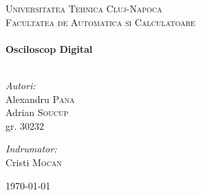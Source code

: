 \begin{titlepage}
\begin{center}

\textsc{\LARGE Universitatea Tehnica Cluj-Napoca}\\[1.5cm]

\textsc{\Large Facultatea de Automatica si Calculatoare}\\[0.5cm]

\HRule \\[0.4cm]
{ \huge \bfseries Osciloscop Digital}\\[0.4cm]

\HRule \\[1.5cm]

\begin{minipage}[t]{0.4\textwidth}
\begin{flushleft} \large
\emph{Autori:}\\
Alexandru \textsc{Pana}\\
Adrian \textsc{Soucup}\\
gr. 30232
\end{flushleft}
\end{minipage}
\begin{minipage}[t]{0.4\textwidth}
\begin{flushright} \large
\emph{Indrumator:} \\
Cristi \textsc{Mocan}
\end{flushright}
\end{minipage}
\vfill

{\large \today}

\end{center}
\end{titlepage}